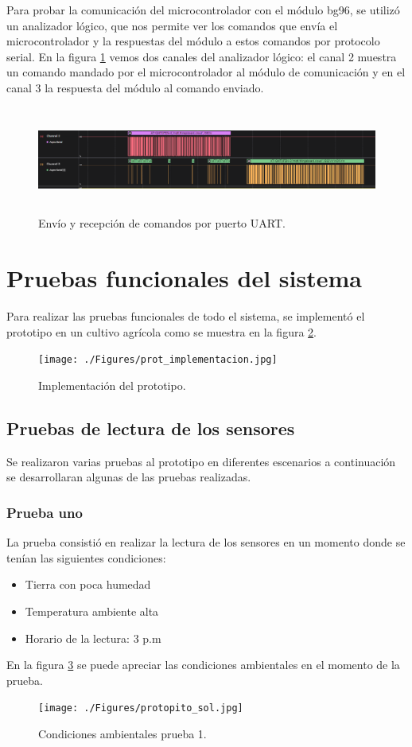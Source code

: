 Para probar la comunicación del microcontrolador con el módulo bg96, se utilizó un analizador lógico, que nos permite ver los comandos que envía el microcontrolador y la respuestas del módulo a estos comandos por protocolo serial.
En la figura \ref{fig:trama uart1} vemos dos canales del analizador  lógico: el canal 2 muestra un comando mandado por el microcontrolador al módulo de comunicación y en el canal 3 la respuesta del módulo al comando enviado.

\begin{figure}[h!]
  \centering
    \includegraphics[width=\linewidth, height=3.5cm]{./Figures/trama_uart1.png}
  \caption{Envío y recepción de comandos por puerto UART.}
    \label{fig:trama uart1}
\end{figure}

\section{Pruebas funcionales del sistema}
Para realizar las pruebas funcionales de todo el sistema, se implementó el prototipo en un cultivo agrícola como se muestra en la figura \ref{fig:implementacion del prototipo}.

\begin{figure}[h!]
  \centering
    \texttt{[image: ./Figures/prot\_implementacion.jpg]}
  \caption{Implementación del prototipo.}
    \label{fig:implementacion del prototipo}
\end{figure}

\subsection{Pruebas de lectura de los sensores}
Se realizaron varias pruebas al prototipo en diferentes escenarios a continuación se desarrollaran algunas de las pruebas realizadas.
\subsubsection{Prueba uno}
La prueba consistió en realizar la lectura de los sensores en un momento donde se tenían las siguientes condiciones:
\begin{itemize}
  \item Tierra con poca humedad
  \item Temperatura ambiente alta 
  \item Horario de la lectura: 3 p.m
\end{itemize}
En la figura \ref{fig:Condicionales ambientales prueba 1} se puede apreciar las condiciones ambientales en el momento de la prueba.
\begin{figure}[h!]
  \centering
    \texttt{[image: ./Figures/protopito\_sol.jpg]}
  \caption{Condiciones ambientales prueba 1.}
    \label{fig:Condicionales ambientales prueba 1}
\end{figure}

